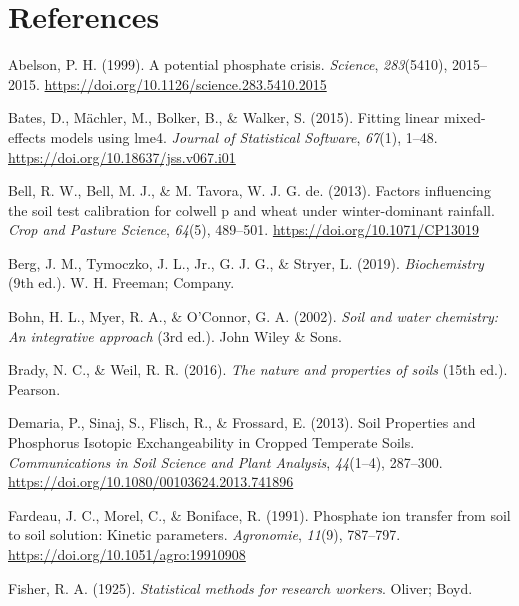 \documentclass[
  a4paper,
]{article}
\newlength{\cslhangindent}
\newenvironment{CSLReferences}[2] %
 {\begin{list}{}{%
  \setlength{\itemindent}{0pt}
  \setlength{\leftmargin}{0pt}
  \setlength{\parsep}{0pt}
  \ifodd #1
   \setlength{\leftmargin}{\cslhangindent}
   \setlength{\itemindent}{-1\cslhangindent}
  \fi
  \setlength{\itemsep}{#2\baselineskip}}}
 {\end{list}}
\begin{document}
\newpage

\section{References}\label{references}

\label{refs}
\begin{CSLReferences}{1}{0}
Abelson, P. H. (1999). A potential phosphate crisis. \emph{Science},
\emph{283}(5410), 2015--2015.
\url{https://doi.org/10.1126/science.283.5410.2015}

Bates, D., Mächler, M., Bolker, B., \& Walker, S. (2015). Fitting linear
mixed-effects models using {lme4}. \emph{Journal of Statistical
Software}, \emph{67}(1), 1--48.
\url{https://doi.org/10.18637/jss.v067.i01}

Bell, R. W., Bell, M. J., \& M. Tavora, W. J. G. de. (2013). Factors
influencing the soil test calibration for colwell p and wheat under
winter-dominant rainfall. \emph{Crop and Pasture Science}, \emph{64}(5),
489--501. \url{https://doi.org/10.1071/CP13019}

Berg, J. M., Tymoczko, J. L., Jr., G. J. G., \& Stryer, L. (2019).
\emph{Biochemistry} (9th ed.). W. H. Freeman; Company.

Bohn, H. L., Myer, R. A., \& O'Connor, G. A. (2002). \emph{Soil and
water chemistry: An integrative approach} (3rd ed.). John Wiley \& Sons.

Brady, N. C., \& Weil, R. R. (2016). \emph{The nature and properties of
soils} (15th ed.). Pearson.

Demaria, P., Sinaj, S., Flisch, R., \& Frossard, E. (2013). Soil
{Properties} and {Phosphorus Isotopic Exchangeability} in {Cropped
Temperate Soils}. \emph{Communications in Soil Science and Plant
Analysis}, \emph{44}(1--4), 287--300.
\url{https://doi.org/10.1080/00103624.2013.741896}

Fardeau, J. C., Morel, C., \& Boniface, R. (1991). Phosphate ion
transfer from soil to soil solution: Kinetic parameters.
\emph{Agronomie}, \emph{11}(9), 787--797.
\url{https://doi.org/10.1051/agro:19910908}

Fisher, R. A. (1925). \emph{Statistical methods for research workers}.
Oliver; Boyd.


\end{CSLReferences}
\end{document}
